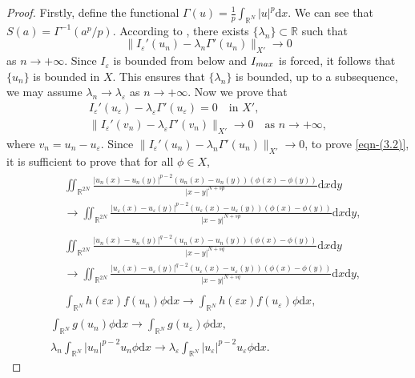 \documentclass[10pt,a4paper]{amsart}
\numberwithin{equation}{section}
\begin{document}
\begin{proof}
Firstly, define the functional 
$\Gamma(u)=\frac{1}{p}\int_{\mathbb{R}^N}|u|^{p}\mathrm{d}x$. 
We can see that $S(a)=\Gamma^{-1}({a^{p}/p})$. 
According to \cite[Proposition 5.12]{ref31}, there exists 
$\{\lambda_n\}\subset\mathbb{R}$ such that
$$
\|I_\varepsilon'(u_n)-\lambda_n\Gamma'(u_n)\|_{X'}\to 0
$$ 
as $n\to+\infty$.
Since $I_\varepsilon$ is bounded from below and $I_{\rm max}$ is forced, it follows that
$\{u_n\}$ is bounded in $X$. 
This ensures that
$\{\lambda_n\}$ is bounded, up to a subsequence, we may assume
$\lambda_n\to \lambda_\varepsilon$ as $n\to+\infty$.
Now we prove that
\begin{gather}\label{eqn-(3.2)}
I_\varepsilon'(u_\varepsilon)-\lambda_\varepsilon\Gamma'(u_\varepsilon)=0\quad 
\text{in } X',\\
\label{eqn-(3.3)}
\|I_\varepsilon'(v_n)-\lambda_\varepsilon\Gamma'(v_n)\|_{X'}\to 0\quad 
\text{as } n\to+\infty,
\end{gather}
where $v_n=u_n-u_\varepsilon$.
Since $\|I_\varepsilon'(u_n)-\lambda_n\Gamma'(u_n)\|_{X'}\to 0$,
to prove \eqref{eqn-(3.2)}, it is sufficient to prove that for all $\phi\in X$,
\begin{gather}\label{eqn-(3.5)}
\begin{aligned}
&\iint_{\mathbb{R}^{2N}}\frac{|u_n(x)-u_n(y)|^{p-2}(u_n(x)-u_n(y))(\phi(x)
 -\phi(y))}{|x-y|^{N+sp}}\mathrm{d}x\mathrm{d}y\\
&\to\iint_{\mathbb{R}^{2N}}\frac{|u_\varepsilon(x)
 -u_\varepsilon(y)|^{p-2}(u_\varepsilon(x)-u_\varepsilon(y))(\phi(x)
 -\phi(y))}{|x-y|^{N+sp}}\mathrm{d}x\mathrm{d}y,
\end{aligned} \\
\label{eqn-(3.6)}
\begin{aligned}
&\iint_{\mathbb{R}^{2N}}\frac{|u_n(x)-u_n(y)|^{q-2}(u_n(x)-u_n(y))(\phi(x)-\phi(y))}{|x-y|^{N+sq}}\mathrm{d}x\mathrm{d}y\\
&\to\iint_{\mathbb{R}^{2N}}\frac{|u_\varepsilon(x)-u_\varepsilon(y)|^{q-2}(u_\varepsilon(x)-u_\varepsilon(y))(\phi(x)-\phi(y))}{|x-y|^{N+sq}}\mathrm{d}x\mathrm{d}y,
\end{aligned} \\
\label{eqn-(3.7)}
\begin{aligned}
&\int_{\mathbb{R}^N}h(\varepsilon x)f(u_n)\phi\mathrm{d}x
\to\int_{\mathbb{R}^N}h(\varepsilon x)f(u_\varepsilon)\phi\mathrm{d}x,
\end{aligned} \\
\label{eqn-(3.8)}
\int_{\mathbb{R}^N}g(u_n)\phi\mathrm{d}x\to
 \int_{\mathbb{R}^N}g(u_\varepsilon)\phi\mathrm{d}x,\\
\label{eqn-(3.9)}
\lambda_n \int_{\mathbb{R}^N}|u_n|^{p-2}u_n\phi\mathrm{d}x
\to\lambda_\varepsilon \int_{\mathbb{R}^N}|u_\varepsilon|^{p-2}
u_\varepsilon\phi\mathrm{d}x.
\end{gather}


\end{proof}
\end{document}
